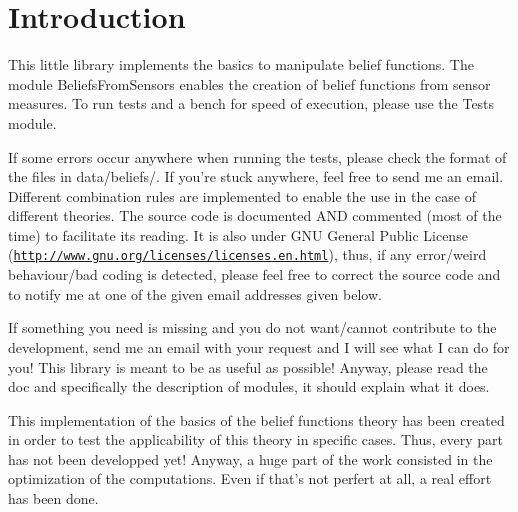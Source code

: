 \hypertarget{index_intro_sec}{}\section{Introduction}\label{index_intro_sec}
This little library implements the basics to manipulate belief functions. The module BeliefsFromSensors enables the creation of belief functions from sensor measures. To run tests and a bench for speed of execution, please use the Tests module.

If some errors occur anywhere when running the tests, please check the format of the files in data/beliefs/. If you're stuck anywhere, feel free to send me an email. Different combination rules are implemented to enable the use in the case of different theories. The source code is documented AND commented (most of the time) to facilitate its reading. It is also under GNU General Public License (\href{http://www.gnu.org/licenses/licenses.en.html}{\tt http://www.gnu.org/licenses/licenses.en.html}), thus, if any error/weird behaviour/bad coding is detected, please feel free to correct the source code and to notify me at one of the given email addresses given below. \par


If something you need is missing and you do not want/cannot contribute to the development, send me an email with your request and I will see what I can do for you! This library is meant to be as useful as possible! Anyway, please read the doc and specifically the description of modules, it should explain what it does.

This implementation of the basics of the belief functions theory has been created in order to test the applicability of this theory in specific cases. Thus, every part has not been developped yet! Anyway, a huge part of the work consisted in the optimization of the computations. Even if that's not perfert at all, a real effort has been done.

